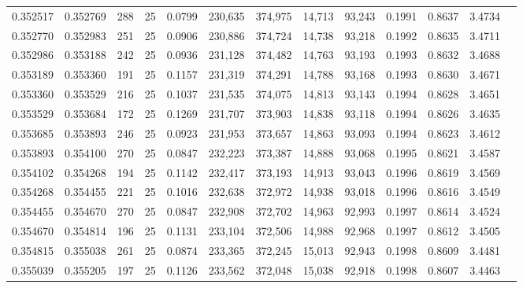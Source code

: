 \begin{tabular}{rrrrrrrrrrrrr}
0.352517 & 0.352769 &   288 &  25 &                                     0.0799 & 230,635 & 374,975 &  14,713 &  93,243 & 0.1991 & 0.8637 & 3.4734 \\
0.352770 & 0.352983 &   251 &  25 &                                     0.0906 & 230,886 & 374,724 &  14,738 &  93,218 & 0.1992 & 0.8635 & 3.4711 \\
0.352986 & 0.353188 &   242 &  25 &                                     0.0936 & 231,128 & 374,482 &  14,763 &  93,193 & 0.1993 & 0.8632 & 3.4688 \\
0.353189 & 0.353360 &   191 &  25 &                                     0.1157 & 231,319 & 374,291 &  14,788 &  93,168 & 0.1993 & 0.8630 & 3.4671 \\
0.353360 & 0.353529 &   216 &  25 &                                     0.1037 & 231,535 & 374,075 &  14,813 &  93,143 & 0.1994 & 0.8628 & 3.4651 \\
0.353529 & 0.353684 &   172 &  25 &                                     0.1269 & 231,707 & 373,903 &  14,838 &  93,118 & 0.1994 & 0.8626 & 3.4635 \\
0.353685 & 0.353893 &   246 &  25 &                                     0.0923 & 231,953 & 373,657 &  14,863 &  93,093 & 0.1994 & 0.8623 & 3.4612 \\
0.353893 & 0.354100 &   270 &  25 &                                     0.0847 & 232,223 & 373,387 &  14,888 &  93,068 & 0.1995 & 0.8621 & 3.4587 \\
0.354102 & 0.354268 &   194 &  25 &                                     0.1142 & 232,417 & 373,193 &  14,913 &  93,043 & 0.1996 & 0.8619 & 3.4569 \\
0.354268 & 0.354455 &   221 &  25 &                                     0.1016 & 232,638 & 372,972 &  14,938 &  93,018 & 0.1996 & 0.8616 & 3.4549 \\
0.354455 & 0.354670 &   270 &  25 &                                     0.0847 & 232,908 & 372,702 &  14,963 &  92,993 & 0.1997 & 0.8614 & 3.4524 \\
0.354670 & 0.354814 &   196 &  25 &                                     0.1131 & 233,104 & 372,506 &  14,988 &  92,968 & 0.1997 & 0.8612 & 3.4505 \\
0.354815 & 0.355038 &   261 &  25 &                                     0.0874 & 233,365 & 372,245 &  15,013 &  92,943 & 0.1998 & 0.8609 & 3.4481 \\
0.355039 & 0.355205 &   197 &  25 &                                     0.1126 & 233,562 & 372,048 &  15,038 &  92,918 & 0.1998 & 0.8607 & 3.4463 \\

\end{tabular}
